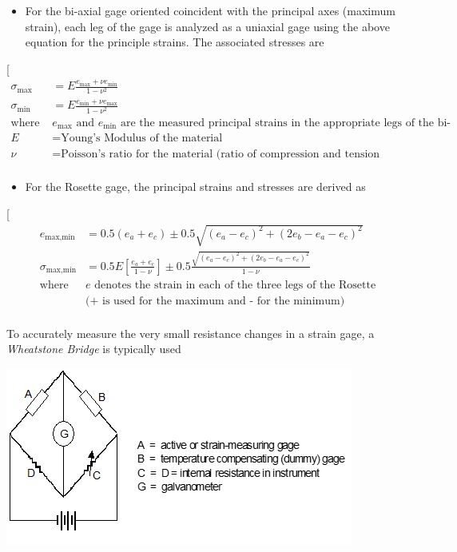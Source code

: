 \documentclass[
]{book}
\providecommand{\tightlist}{%
  \setlength{\itemsep}{0pt}\setlength{\parskip}{0pt}}
\begin{document}
\begin{itemize}
\tightlist
\item
  For the bi-axial gage oriented coincident with the principal axes (maximum strain), each leg of the gage is analyzed as a uniaxial gage using the above equation for the principle strains. The associated stresses are
\end{itemize}

{[}
\begin{align}
  \sigma_{\text{max}} &= E \frac{e_{\text{max}} + \nu e_{\text{min}}}{1 - \nu^2} \\
  \sigma_{\text{min}} &= E \frac{e_{\text{min}} + \nu e_{\text{max}}}{1 - \nu^2} \\
  \text{where } & e_{\text{max}} \text{ and } e_{\text{min}} \text{ are the measured principal strains in the appropriate legs of the bi-axial gage} \\
  E &= \text{Young's Modulus of the material} \\
  \nu &= \text{Poisson's ratio for the material (ratio of compression and tension strains)} \\
  \end{align}

\begin{itemize}
\tightlist
\item
  For the Rosette gage, the principal strains and stresses are derived as
\end{itemize}

{[}
\begin{align}
  e_{\text{max,min}} &= 0.5 \left(e_a + e_c \right) \pm 0.5 \sqrt{\left(e_a - e_c \right)^2 + \left(2e_b - e_a - e_c \right)^2  } \\
  \sigma_{\text{max,min}} &= 0.5 E \left[ \frac{e_a + e_c}{1 - \nu} \right] \pm 0.5 \frac{\sqrt{\left(e_a - e_c \right)^2 + \left(2e_b - e_a - e_c \right)^2  }}{1 - \nu} \\
  \text{where } & e \text{ denotes the strain in each of the three legs of the Rosette} \\
  &\text{(+ is used for the maximum and - for the minimum)} \\
\end{align}

To accurately measure the very small resistance changes in a strain gage, a \emph{Wheatstone Bridge} is typically used

\includegraphics[width=4.49931in,height=2.3125in]{media/09/image7.png}
\end{document}
